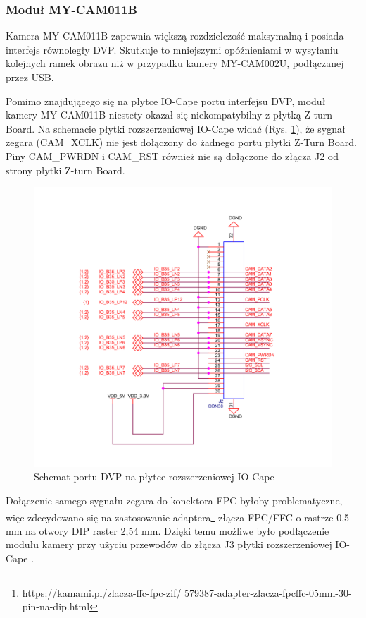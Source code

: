 \subsubsection{Moduł MY-CAM011B}

Kamera MY-CAM011B zapewnia większą rozdzielczość maksymalną i posiada interfejs równoległy DVP. Skutkuje to mniejszymi 
opóźnieniami w wysyłaniu kolejnych ramek obrazu niż w przypadku kamery MY-CAM002U, podłączanej przez USB. 

Pomimo znajdującego się na płytce IO-Cape portu interfejsu DVP, moduł kamery MY-CAM011B niestety okazał się niekompatybilny z 
płytką Z-turn Board. Na schemacie płytki rozszerzeniowej IO-Cape widać (Rys. \ref{cam-schematic}), że sygnał zegara 
(CAM\_XCLK) nie jest dołączony do żadnego portu płytki Z-Turn Board. Piny CAM\_PWRDN i CAM\_RST również nie są dołączone do 
złącza J2 od strony płytki Z-turn Board. 

\begin{figure}[!h]
  \centering
  \includegraphics[width=\textwidth]{img/cam-schematic.png}
  \caption{Schemat portu DVP na płytce rozszerzeniowej IO-Cape \cite{ZturnIOCapeSchematic}}
  \label{cam-schematic}
\end{figure}

Dołączenie samego sygnału zegara do konektora FPC byłoby problematyczne, więc zdecydowano się na 
zastosowanie adaptera\footnote{https://kamami.pl/zlacza-ffc-fpc-zif/
579387-adapter-zlacza-fpcffc-05mm-30-pin-na-dip.html} złącza FPC/FFC o 
rastrze 0,5 mm na otwory DIP raster 2,54 mm. Dzięki temu możliwe było podłączenie modułu kamery 
przy użyciu przewodów do złącza J3 płytki rozszerzeniowej IO-Cape \cite{ZturnIOCapeSchematic}.


